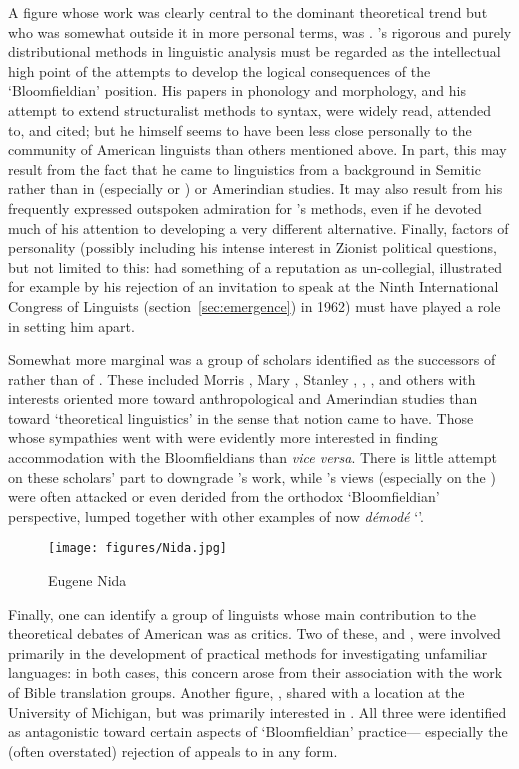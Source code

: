 A figure whose work was clearly central to the dominant theoretical
trend but who was somewhat outside it in more personal terms, was
. {\Harris}'s rigorous and purely distributional methods in
linguistic analysis must be regarded as the intellectual high point of
the attempts to develop the logical consequences of the
`Bloomfieldian' position. His papers in phonology and morphology, and
his attempt to extend structuralist methods to syntax, were widely
read, attended to, and cited; but he himself seems to have been less
close personally to the community of American linguists than others
mentioned above. In part, this may result from the fact that he came
to linguistics from a background in Semitic rather than in
 (especially  or ) or Amerindian
studies. It may also result from his frequently expressed outspoken
admiration for {\Sapir}'s methods, even if he devoted much of his
attention to developing a very different alternative. Finally, factors
of personality (possibly including his intense interest in Zionist
political questions, but not limited to this: {\Harris} had something of
a reputation as un-collegial, illustrated for example by his rejection
of an invitation to speak at the Ninth International Congress of
Linguists (section~\ref{sec:emergence}) in 1962) must have played a
role in setting him apart.

Somewhat more marginal was a group of scholars identified as the
successors of {\Sapir} rather than of {\Bloomfield}. These included Morris
{\Swadesh}, Mary {\Haas}, Stanley {\Newman}, , , and
others with interests oriented more toward anthropological and
Amerindian studies than toward `theoretical linguistics' in the sense
that notion came to have. Those whose sympathies went with {\Sapir} were
evidently more interested in finding accommodation with the
Bloomfieldians than \emph{vice versa}. There is little attempt on
these scholars' part to downgrade {\Bloomfield}'s work, while {\Sapir}'s
views (especially on the ) were often
attacked or even derided from the orthodox `Bloomfieldian'
perspective, lumped together with other examples of now \emph{démodé}
`'.

\begin{wrapfigure}{r}{.3\textwidth}
  \texttt{[image: figures/Nida.jpg]}
  \caption{Eugene Nida}
  \label{fig:ch.structuralists.nida}
\end{wrapfigure}
Finally, one can identify a group of linguists whose main contribution
to the theoretical debates of American  was as
critics. Two of these,  and , were involved
primarily in the development of practical methods for investigating
unfamiliar languages: in both cases, this concern arose from their
association with the work of Bible translation groups. Another figure,
, shared with {\Pike} a location at the University of
Michigan, but was primarily interested in . All three were
identified as antagonistic toward certain aspects of `Bloomfieldian'
practice— especially the (often overstated) rejection of appeals to
 in any form.

